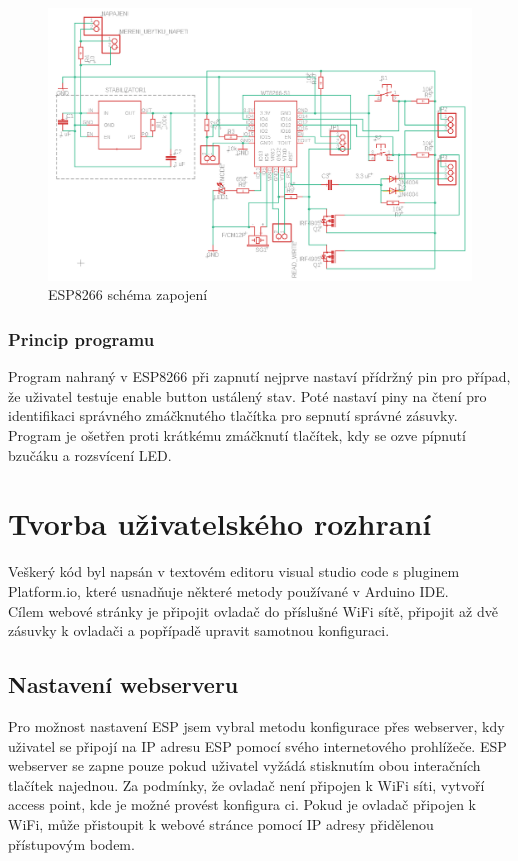 \documentclass[a4paper, 12pt]{report}
\begin{document}
    \begin{figure}[h]
        \centering
        \includegraphics[width=12cm]{images/esp8266_schema}
        \caption{ESP8266 schéma zapojení}
        \label{fig:ESP8266_DPS}
    \end{figure}
    \subsubsection{Princip programu}
    Program nahraný v ESP8266 při zapnutí nejprve nastaví přídržný pin pro případ, že uživatel testuje enable button ustálený stav.
    Poté nastaví piny na čtení pro identifikaci správného zmáčknutého tlačítka pro sepnutí správné zásuvky.
    Program je ošetřen proti krátkému zmáčknutí tlačítek, kdy se ozve pípnutí bzučáku a rozsvícení LED\@.

    \section{Tvorba uživatelského rozhraní}
    Veškerý kód byl napsán v textovém editoru visual studio code s pluginem Platform.io, které usnadňuje některé metody používané v Arduino IDE.\\
    Cílem webové stránky je připojit ovladač do příslušné WiFi sítě, připojit až dvě zásuvky k ovladači a popřípadě upravit samotnou konfiguraci.

    \subsection{Nastavení webserveru}
    Pro možnost nastavení ESP jsem vybral metodu konfigurace přes webserver, kdy uživatel se připojí na IP adresu ESP pomocí svého internetového prohlížeče.
    ESP webserver se zapne pouze pokud uživatel vyžádá stisknutím obou interačních tlačítek najednou.
    Za podmínky, že ovladač není připojen k WiFi síti, vytvoří access point, kde je možné provést konfigura
    ci.
    Pokud je ovladač připojen k WiFi, může přistoupit k webové stránce pomocí IP adresy přidělenou přístupovým bodem.
\end{document}
